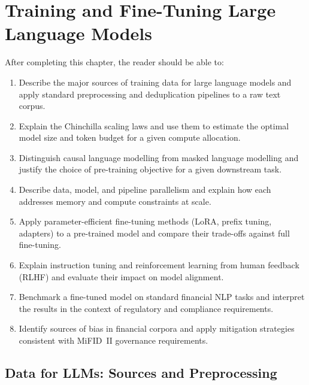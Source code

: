\chapter{Training and Fine-Tuning Large Language Models}
\label{ch:llm-training}

\begin{remark}
After completing this chapter, the reader should be able to:
\begin{enumerate}
  \item Describe the major sources of training data for large language models and apply
        standard preprocessing and deduplication pipelines to a raw text corpus.
  \item Explain the Chinchilla scaling laws and use them to estimate the optimal model
        size and token budget for a given compute allocation.
  \item Distinguish causal language modelling from masked language modelling and justify
        the choice of pre-training objective for a given downstream task.
  \item Describe data, model, and pipeline parallelism and explain how each addresses
        memory and compute constraints at scale.
  \item Apply parameter-efficient fine-tuning methods (LoRA, prefix tuning, adapters)
        to a pre-trained model and compare their trade-offs against full fine-tuning.
  \item Explain instruction tuning and reinforcement learning from human feedback (RLHF)
        and evaluate their impact on model alignment.
  \item Benchmark a fine-tuned model on standard financial NLP tasks and interpret the
        results in the context of regulatory and compliance requirements.
  \item Identify sources of bias in financial corpora and apply mitigation strategies
        consistent with MiFID~II governance requirements.
\end{enumerate}
\end{remark}


\section{Data for LLMs: Sources and Preprocessing}
\label{sec:data-sources}

